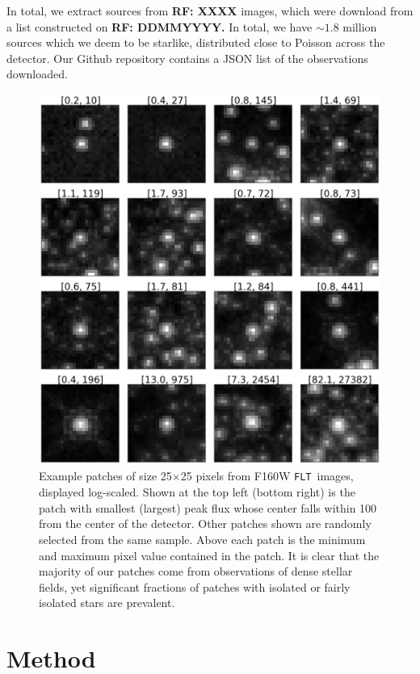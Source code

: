 \documentclass[12pt,letterpaper,preprint]{aastex}
\newcommand{\rf}[1]{\textbf{RF: #1}}
\newcommand{\FLT}{\texttt{FLT}}
\begin{document}
In total, we extract sources from \rf{XXXX} images, which were download from a list constructed on 
\rf{DDMMYYYY.}  In total, we have $\sim1.8$ million sources which we deem to be starlike, distributed 
close to Poisson across the detector.  Our Github repository contains a JSON list of the observations 
downloaded.

\begin{figure}
\centering
 \includegraphics[clip=true, trim=0cm 0cm 0.0cm 0.cm,width=12cm]{../../plots/paper/fig1.png}
\caption{Example patches of size 25$\times$25 pixels from F160W \FLT\, images, displayed log-scaled.
Shown at the top left (bottom right) is the patch with smallest (largest) peak flux whose center falls within
100 from the center of the detector.  Other patches shown are randomly selected from the same sample.
Above each patch is the minimum and maximum pixel value contained in the patch.
It is clear that the majority of our patches come from observations of dense stellar fields, yet significant 
fractions of patches with isolated or fairly isolated stars are prevalent.}
\label{fig:data-examples}
\end{figure}



\section{Method}
\end{document}

